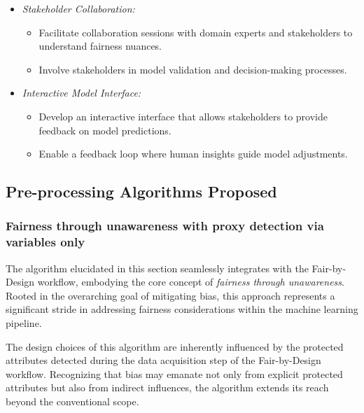 \documentclass[12pt,a4paper,openright,twoside]{book}
\begin{document}
\begin{itemize}
    
    \item \emph{Stakeholder Collaboration:}
    
    \begin{itemize}
    
        \item Facilitate collaboration sessions with domain experts and stakeholders to understand fairness nuances.
    
        \item Involve stakeholders in model validation and decision-making processes.
    
    \end{itemize}
    
    \item \emph{Interactive Model Interface:}
    
    \begin{itemize}
    
        \item Develop an interactive interface that allows stakeholders to provide feedback on model predictions.
    
        \item Enable a feedback loop where human insights guide model adjustments.
    
    \end{itemize}

\end{itemize}

\subsection{Pre-processing Algorithms Proposed}

\subsubsection{Fairness through unawareness with proxy detection via variables only}

The algorithm elucidated in this section seamlessly integrates with the Fair-by-Design workflow, embodying the core concept of \emph{fairness through unawareness}. Rooted in the overarching goal of mitigating bias, this approach represents a significant stride in addressing fairness considerations within the machine learning pipeline.

The design choices of this algorithm are inherently influenced by the protected attributes detected during the data acquisition step of the Fair-by-Design workflow. Recognizing that bias may emanate not only from explicit protected attributes but also from indirect influences, the algorithm extends its reach beyond the conventional scope.
\end{document}
